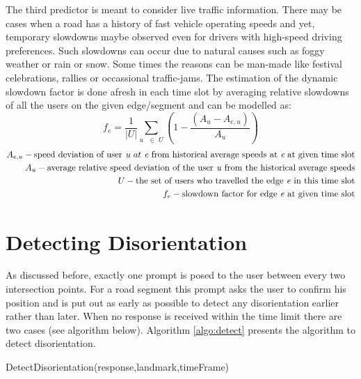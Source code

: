 \documentclass{iitkthesis}
\begin{document}
The third predictor is meant to consider live traffic information. There 
may be cases when a road has a history of fast vehicle operating speeds and 
yet, temporary slowdowns maybe observed even for drivers with high-speed 
driving preferences. Such slowdowns can occur due to natural causes   
such as foggy weather or rain or snow. Some times the reasons can be man-made 
like festival celebrations, rallies or occassional traffic-jams. The 
estimation of the dynamic slowdown factor is 
done afresh in each time slot by averaging relative slowdowns
of all the users on the given edge/segment and can be modelled as:
\[\displaystyle f_{e} = \frac{1}{|U|}\sum_{u \text{ } \in \textit{ U}}(1-\frac{(A_u - A_{e,u})}{A_u})\]  
\begin{align*}
A_{e,u} - \text{speed deviation of user} \textit{ u } at \textit{ e } \text{from historical average speeds at }\textit{e} \text{ at given time slot} \\
A_u - \text{average relative speed deviation of the user \textit{u} from the historical average speeds} \\
U - \text{the set of users who travelled the edge \textit{e} in this time slot} \\
f_e - \text{slowdown factor for edge \textit{e} at given time slot}
\end{align*}
\section{Detecting Disorientation}
As discussed before, exactly one prompt is posed to the user between 
every two intersection points. For a road segment this prompt asks the 
user to confirm his position and is put out as early as possible 
to detect any disorientation earlier rather than later. When no response
is received within the time limit there are two cases (see 
algorithm below).  Algorithm \ref{algo:detect} presents the algorithm to 
detect disorientation.

\begin{algorithm}[H]
\label{algo:detect}
\SetVline
\dontprintsemicolon
{}
\BlankLine

\caption{DetectDisorientation(response,landmark,timeFrame)}
\end{algorithm}
\end{document}
